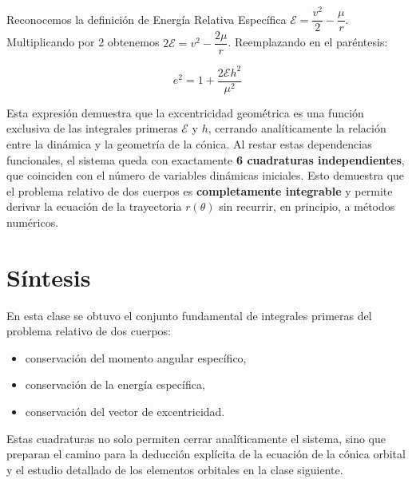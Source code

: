 Reconocemos la definición de Energía Relativa Específica $\mathcal{E} = \dfrac{v^2}{2} - \dfrac{\mu}{r}$. Multiplicando por 2 obtenemos $2\mathcal{E} = v^2 - \dfrac{2\mu}{r}$. Reemplazando en el paréntesis:

$$e^2 = 1 + \frac{2\mathcal{E}h^2}{\mu^2}$$

Esta expresión demuestra que la excentricidad geométrica es una función exclusiva de las integrales primeras $\mathcal{E}$ y $h$, cerrando analíticamente la relación entre la dinámica y la geometría de la cónica.
Al restar estas dependencias funcionales, el sistema queda con exactamente \textbf{6 cuadraturas independientes}, que coinciden con el número de variables dinámicas iniciales. Esto demuestra que el problema relativo de dos cuerpos es \textbf{completamente integrable} y permite derivar la ecuación de la trayectoria \(r(\theta)\) sin recurrir, en principio, a métodos numéricos.

\section{Síntesis}
En esta clase se obtuvo el conjunto fundamental de integrales primeras del problema relativo de dos cuerpos:
\begin{itemize}
    \item conservación del momento angular específico,
    \item conservación de la energía específica,
    \item conservación del vector de excentricidad.
\end{itemize}

Estas cuadraturas no solo permiten cerrar analíticamente el sistema, sino que preparan el camino para la deducción explícita de la ecuación de la cónica orbital y el estudio detallado de los elementos orbitales en la clase siguiente.